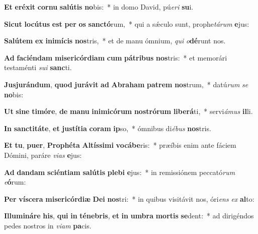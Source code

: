 \item \textbf{Et} \textbf{e}\textbf{ré}\textbf{xit} \textbf{cor}\textbf{nu} \textbf{sa}\textbf{lú}\textbf{tis} \textbf{no}bis:~* in domo David, pú\textit{e}\textit{ri} \textbf{su}i.
\item \textbf{Sic}\textbf{ut} \textbf{lo}\textbf{cú}\textbf{tus} \textbf{est} \textbf{per} \textbf{os} \textbf{sanc}\textbf{tó}rum,~* qui a sǽculo sunt, prophe\textit{tá}\textit{rum} \textbf{e}jus:
\item \textbf{Sa}\textbf{lú}\textbf{tem} \textbf{ex} \textbf{in}\textbf{i}\textbf{mí}\textbf{cis} \textbf{nos}tris,~* et de manu ómnium, \textit{qui} \textit{o}\textbf{dé}runt nos.
\item \textbf{Ad} \textbf{fa}\textbf{ci}\textbf{én}\textbf{dam} \textbf{mi}\textbf{se}\textbf{ri}\textbf{cór}\textbf{di}\textbf{am} \textbf{cum} \textbf{pá}\textbf{tri}\textbf{bus} \textbf{nos}tris:~* et memorári testaménti \textit{su}\textit{i} \textbf{sanc}ti.
\item \textbf{Ju}\textbf{sju}\textbf{rán}\textbf{dum}, \textbf{quod} \textbf{ju}\textbf{rá}\textbf{vit} \textbf{ad} \textbf{A}\textbf{bra}\textbf{ham} \textbf{pa}\textbf{trem} \textbf{nos}trum,~* datú\textit{rum} \textit{se} \textbf{no}bis:
\item \textbf{Ut} \textbf{si}\textbf{ne} \textbf{ti}\textbf{mó}\textbf{re}, \textbf{de} \textbf{ma}\textbf{nu} \textbf{in}\textbf{i}\textbf{mi}\textbf{có}\textbf{rum} \textbf{nos}\textbf{tró}\textbf{rum} \textbf{li}\textbf{be}\textbf{rá}ti,~* servi\textit{á}\textit{mus} \textbf{il}li.
\item \textbf{In} \textbf{sanc}\textbf{ti}\textbf{tá}\textbf{te}, \textbf{et} \textbf{jus}\textbf{tí}\textbf{ti}\textbf{a} \textbf{co}\textbf{ram} \textbf{ip}so,~* ómnibus di\textit{é}\textit{bus} \textbf{nos}tris.
\item \textbf{Et} \textbf{tu}, \textbf{pu}\textbf{er}, \textbf{Pro}\textbf{phé}\textbf{ta} \textbf{Al}\textbf{tís}\textbf{si}\textbf{mi} \textbf{vo}\textbf{cá}\textbf{be}ris:~* præíbis enim ante fáciem Dómini, paráre \textit{vi}\textit{as} \textbf{e}jus:
\item \textbf{Ad} \textbf{dan}\textbf{dam} \textbf{sci}\textbf{én}\textbf{ti}\textbf{am} \textbf{sa}\textbf{lú}\textbf{tis} \textbf{ple}\textbf{bi} \textbf{e}jus:~* in remissiónem peccató\textit{rum} \textit{e}\textbf{ó}rum:
\item \textbf{Per} \textbf{ví}\textbf{sce}\textbf{ra} \textbf{mi}\textbf{se}\textbf{ri}\textbf{cór}\textbf{di}\textbf{æ} \textbf{De}\textbf{i} \textbf{nos}tri:~* in quibus visitávit nos, óri\textit{ens} \textit{ex} \textbf{al}to:
\item \textbf{Il}\textbf{lu}\textbf{mi}\textbf{ná}\textbf{re} \textbf{his}, \textbf{qui} \textbf{in} \textbf{té}\textbf{ne}\textbf{bris}, \textbf{et} \textbf{in} \textbf{um}\textbf{bra} \textbf{mor}\textbf{tis} \textbf{se}dent:~* ad dirigéndos pedes nostros in \textit{vi}\textit{am} \textbf{pa}cis.
